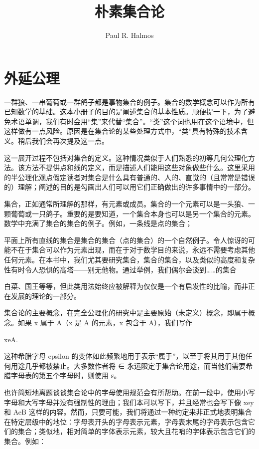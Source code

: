 \documentclass[12pt,a4paper]{ctexbook}
\title{朴素集合论}
\author{Paul R. Halmos}
\date{}
\theoremstyle{definition}
\theoremstyle{remark}
\begin{document}
\maketitle
\tableofcontents

\chapter{外延公理}

一群狼、一串葡萄或一群鸽子都是事物集合的例子。集合的数学概念可以作为所有已知数学的基础。这本小册子的目的是阐述集合的基本性质。顺便提一下，为了避免术语单调，我们有时会用“集”来代替“集合”。“类”这个词也用在这个语境中，但这样做有一点风险。原因是在集合论的某些处理方式中，“类”具有特殊的技术含义。稍后我们会再次提及这一点。

这一展开过程不包括对集合的定义。这种情况类似于人们熟悉的初等几何公理化方法。该方法不提供点和线的定义，而是描述人们能用这些对象做些什么。这里采用的半公理化观点假定读者对集合是什么具有普通的、人的、直觉的（且常常是错误的）理解；阐述的目的是勾画出人们可以用它们正确做出的许多事情中的一部分。

集合，正如通常所理解的那样，有元素或成员。集合的一个元素可以是一头狼、一颗葡萄或一只鸽子。重要的是要知道，一个集合本身也可以是另一个集合的元素。数学中充满了集合的集合的例子。例如，一条线是点的集合；

平面上所有直线的集合是集合的集合（点的集合）的一个自然例子。令人惊讶的可能不在于集合可以作为元素出现，而在于对于数学目的来说，永远不需要考虑其他任何元素。在本书中，我们尤其要研究集合，集合的集合，以及类似的高度和复杂性有时令人恐惧的高塔——别无他物。通过举例，我们偶尔会谈到……的集合

白菜、国王等等，但此类用法始终应被解释为仅仅是一个有启发性的比喻，而非正在发展的理论的一部分。

集合论的主要概念，在完全公理化的研究中是主要原始（未定义）概念，即属于概念。如果 x 属于 A（x 是 A 的元素，x 包含于 A），我们写作

xeA.

这种希腊字母 epsilon 的变体如此频繁地用于表示“属于”，以至于将其用于其他任何用途几乎都被禁止。大多数作者将 ∈ 永远限定于集合论用途，而当他们需要希腊字母表的第五个字母时，则使用 ε。

也许简短地离题谈谈集合论中的字母使用规范会有所帮助。在前一段中，使用小写字母和大写字母并没有强制性的理由；我们本可以写下，并且经常也会写下像 xey 和 AeB 这样的内容。然而，只要可能，我们将通过一种约定来非正式地表明集合在特定层级中的地位：字母表开头的字母表示元素，字母表末尾的字母表示包含它们的集合；类似地，相对简单的字体表示元素，较大且花哨的字体表示包含它们的集合。例如：
\end{document}
